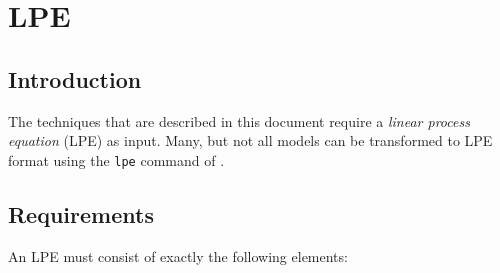 \chapter{LPE}

\section{Introduction}
The techniques that are described in this document require a \emph{linear process equation} (LPE) as input.
Many, but not all models can be transformed to LPE format using the \texttt{lpe} command of \txs{}.

\section{Requirements}

An LPE must consist of exactly the following elements:

